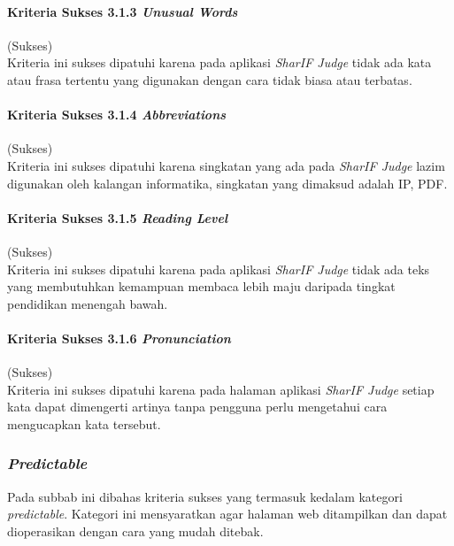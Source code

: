 \paragraph{Kriteria Sukses 3.1.3 \textit{Unusual Words}}
\label{subsubsec:kepatuhan_kriteria_3.1.3}
(Sukses) \\

Kriteria ini sukses dipatuhi karena pada aplikasi \textit{SharIF Judge} tidak ada kata atau frasa tertentu yang digunakan dengan cara tidak biasa atau terbatas. 

\paragraph{Kriteria Sukses 3.1.4 \textit{Abbreviations}}
\label{subsubsec:kepatuhan_kriteria_3.1.4}
(Sukses) \\

Kriteria ini sukses dipatuhi karena singkatan yang ada pada \textit{SharIF Judge} lazim digunakan oleh kalangan informatika, singkatan yang dimaksud adalah IP, PDF.

\paragraph{Kriteria Sukses 3.1.5 \textit{Reading Level}}
\label{subsubsec:kepatuhan_kriteria_3.1.5}
(Sukses) \\

Kriteria ini sukses dipatuhi karena pada aplikasi \textit{SharIF Judge} tidak ada teks yang membutuhkan kemampuan membaca lebih maju daripada tingkat pendidikan menengah bawah.

\paragraph{Kriteria Sukses 3.1.6 \textit{Pronunciation}}
\label{subsubsec:kepatuhan_kriteria_3.1.6}
(Sukses) \\

Kriteria ini sukses dipatuhi karena pada halaman aplikasi \textit{SharIF Judge} setiap kata dapat dimengerti artinya tanpa pengguna perlu mengetahui cara mengucapkan kata tersebut.

\subsubsection{\textit{Predictable}}
\label{subsubsec:predictable}

Pada subbab ini dibahas kriteria sukses yang termasuk kedalam kategori \textit{predictable}. Kategori ini mensyaratkan agar halaman web ditampilkan dan dapat dioperasikan dengan cara yang mudah ditebak.

